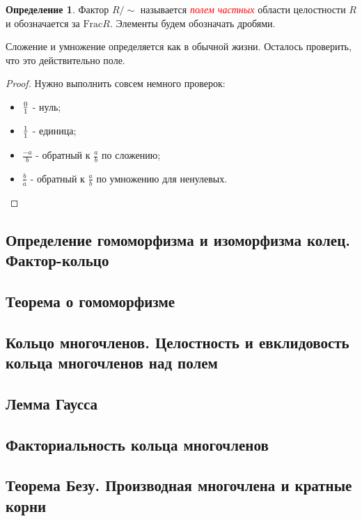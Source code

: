 \documentclass[a4paper,100pt]{article}
\theoremstyle{indented}
\theoremstyle{definition}
\newtheorem{defn}{Определение}
\theoremstyle{remark}
\begin{document}
\begin{defn}
    Фактор $R/\sim$ называется \hypertarget{n18}{\textcolor{red}{\textit{полем частных}}} области целостности $R$ и обозначается за $\text{Frac}R$. Элементы будем обозначать дробями.
\end{defn}

Сложение и умножение определяется как в обычной жизни. Осталось проверить, что это действительно поле.

\begin{proof} Нужно выполнить совсем немного проверок: \
    \begin{itemize}
        \item $0\over 1$ - нуль;
        \item $1\over 1$ - единица;
        \item $\frac{-a}{b}$ - обратный к $\frac{a}{b}$ по сложению;
        \item $\frac{b}{a}$ - обратный к $\frac{a}{b}$ по умножению для ненулевых.
    \end{itemize}
\end{proof}

\resetall

\subsection{Определение гомоморфизма и изоморфизма колец. Фактор-кольцо}

\subsection{Теорема о гомоморфизме}

\subsection{Кольцо многочленов. Целостность и евклидовость кольца многочленов над полем}

\subsection{Лемма Гаусса}

\subsection{Факториальность кольца многочленов}

\subsection{Теорема Безу. Производная многочлена и кратные корни}
\end{document}
